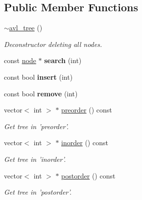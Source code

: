 \subsection*{Public Member Functions}
\begin{DoxyCompactItemize}
\item 
\hypertarget{classavl__tree_aae7f6a688cb231f6ddbfa486f61b18f4}{\hyperlink{classavl__tree_aae7f6a688cb231f6ddbfa486f61b18f4}{$\sim$avl\-\_\-tree} ()}\label{classavl__tree_aae7f6a688cb231f6ddbfa486f61b18f4}

\begin{DoxyCompactList}\small\item\em Deconstructor deleting all nodes. \end{DoxyCompactList}\item 
\hypertarget{classavl__tree_a7554d1333ab18cdb9472bdfab183bf28}{const \hyperlink{structavl__tree_1_1node}{node} $\ast$ {\bfseries search} (int)}\label{classavl__tree_a7554d1333ab18cdb9472bdfab183bf28}

\item 
\hypertarget{classavl__tree_a671d955359a56db67f09bc5dea32201a}{const bool {\bfseries insert} (int)}\label{classavl__tree_a671d955359a56db67f09bc5dea32201a}

\item 
\hypertarget{classavl__tree_a6ea8ac86887224e777c3531d5fa347f8}{const bool {\bfseries remove} (int)}\label{classavl__tree_a6ea8ac86887224e777c3531d5fa347f8}

\item 
vector$<$ int $>$ $\ast$ \hyperlink{classavl__tree_a54d8bd6f3b5d23e9c6ed2ca3046e2f51}{preorder} () const 
\begin{DoxyCompactList}\small\item\em Get tree in 'preorder'. \end{DoxyCompactList}\item 
vector$<$ int $>$ $\ast$ \hyperlink{classavl__tree_a9c35affd0642ddd8fa6e1bea92e9dfb9}{inorder} () const 
\begin{DoxyCompactList}\small\item\em Get tree in 'inorder'. \end{DoxyCompactList}\item 
vector$<$ int $>$ $\ast$ \hyperlink{classavl__tree_a153a69d4bfe9952ec59c18c76cb5932d}{postorder} () const 
\begin{DoxyCompactList}\small\item\em Get tree in 'postorder'. \end{DoxyCompactList}\end{DoxyCompactItemize}


